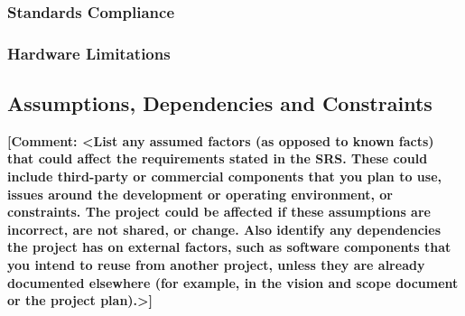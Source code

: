 \documentclass[a4paper]{article}
\newcommand{\comment}[1]{\textbf{[Comment: #1]}}
\begin{document}
        \subsubsection{Standards Compliance}
        
        \subsubsection{Hardware Limitations}
    
    \subsection{Assumptions, Dependencies and Constraints}
    \comment{<List any assumed factors (as opposed to known facts) that could affect the requirements stated in the SRS. These could include third-party or commercial components that you plan to use, issues around the development or operating environment, or constraints. The project could be affected if these assumptions are incorrect, are not shared, or change. Also identify any dependencies the project has on external factors, such as software components that you intend to reuse from another project, unless they are already documented elsewhere (for example, in the vision and scope document or the project plan).>}
\end{document}
